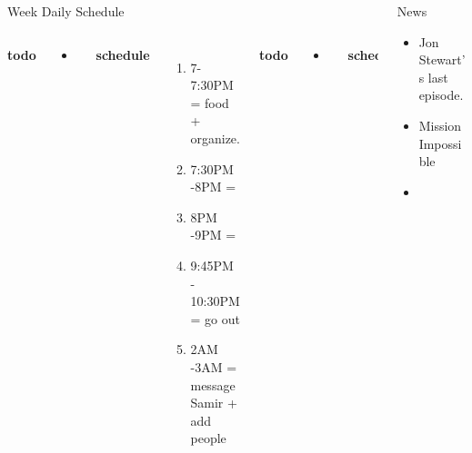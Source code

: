 \documentclass[serif, mathserif, final]{beamer}
\begin{document}
\begin{frame}
\begin{columns}
\begin{column}{0.50\linewidth}
\begin{block}{Week Daily Schedule}
\begin{columns}
          \textbf{\small todo}\\
          \begin{itemize} 
            \tiny \item \tiny
          \end{itemize}
          \textbf{\small schedule}\\ 
          \begin{enumerate}
            \tiny \item \tiny 7-7:30PM = food + organize.  
            \tiny \item \tiny 7:30PM -8PM = 
            \tiny \item \tiny 8PM -9PM = 
            \tiny \item \tiny 9:45PM - 10:30PM = go out 
            \tiny \item \tiny 2AM -3AM =  message Samir + add people
          \end{enumerate}
          
          \textbf{\small todo}\\
          \begin{itemize} 
           \tiny \item \tiny 
          \end{itemize}

          \textbf{\small schedule}\\
          \begin{enumerate} 
            \tiny \item \tiny 3PM - 4PM  = think about weekend, any
            other tasks 
          \item \tiny 5-7PM = Comm work 
          \item \tiny 8PM - 10PM = worklife work. 
          \end{enumerate} 
        \end{columns}
      \end{block}
    \end{column}%
    
    \begin{column}{0.20\linewidth}
      \begin{block}{News}
        \begin{itemize} 
          \tiny \item \tiny Jon Stewart's last episode. 
        \item \tiny Mission Impossible 
        \item \tiny 
        \end{itemize}
      \end{block}
      

\end{column}
\end{columns}
\end{frame}
\end{document}
